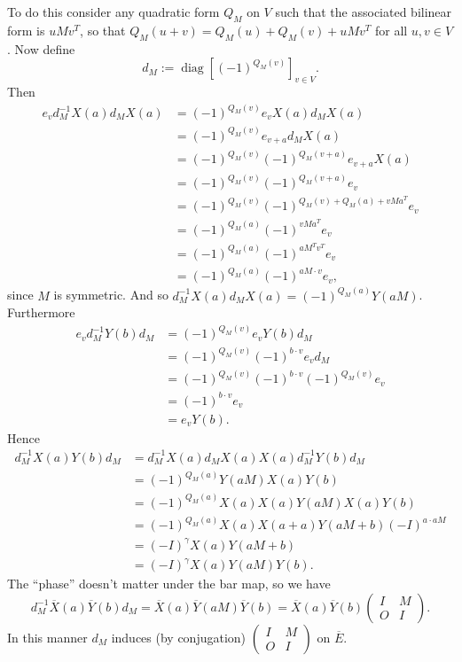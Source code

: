 \documentclass[a4paper]{article}
\DeclareMathOperator{\diag}{diag}
\begin{document}
  To do this consider any quadratic form $Q_M$ on $V$ such
  that the associated bilinear form is $u M v^{T}$, so that
  $Q_M(u+v) = Q_M(u) + Q_M(v) + uMv^{T}$ for all $u, v \in
  V$. Now define
  \begin{equation}
    d_M := \diag\left[(-1)^{Q_M(v)}\right]_{v \in V}.
  \end{equation}
  Then 
  \begin{align*}
    e_v d_M^{-1} X(a) d_M X(a)
    &= (-1)^{Q_M(v)} e_v X(a) d_M X(a) \\
    &= (-1)^{Q_M(v)} e_{v+a} d_M X(a) \\
    &= (-1)^{Q_M(v)} (-1)^{Q_M(v+a)} e_{v+a} X(a) \\
    &= (-1)^{Q_M(v)} (-1)^{Q_M(v+a)} e_v \\
    &= (-1)^{Q_M(v)} (-1)^{Q_M(v) + Q_M(a) + vMa^{T}} e_v \\
    &= (-1)^{Q_M(a)} (-1)^{vMa^{T}} e_v \\
    &= (-1)^{Q_M(a)} (-1)^{aM^{T}v^{T}} e_v \\
    &= (-1)^{Q_M(a)} (-1)^{aM \cdot v} e_v,
  \end{align*}
  since $M$ is symmetric. And so $d_M^{-1} X(a) d_M X(a) =
  (-1)^{Q_M(a)} Y(aM)$. Furthermore
  \begin{align*}
    e_v d_M^{-1} Y(b) d_M
    &= (-1)^{Q_M(v)} e_v Y(b) d_M \\
    &= (-1)^{Q_M(v)} (-1)^{b \cdot v} e_v d_M \\
    &= (-1)^{Q_M(v)} (-1)^{b \cdot v} (-1)^{Q_M(v)} e_v \\
    &= (-1)^{b \cdot v} e_v \\
    &= e_v Y(b).
  \end{align*}
  Hence
  \begin{align*}
    d_M^{-1} X(a)Y(b)d_M
    &= d_M^{-1} X(a) d_M X(a) X(a) d_M^{-1} Y(b) d_M \\
    &= (-1)^{Q_M(a)} Y(aM) X(a) Y(b) \\
    &= (-1)^{Q_M(a)} X(a) X(a) Y(aM) X(a) Y(b) \\
    &= (-1)^{Q_M(a)} X(a) X(a+a) Y(aM+b) (-I)^{a \cdot aM}
    \\
    &= (-I)^{\gamma} X(a) Y(aM+b) \\
    &= (-I)^{\gamma} X(a) Y(aM) Y(b).
  \end{align*}
  The ``phase'' doesn't matter under the bar map, so we have
  \begin{equation}
    d_M^{-1} \overline{X}(a)\overline{Y}(b)d_M
    = \overline{X}(a) \overline{Y}(aM) \overline{Y}(b)
    = \overline{X}(a)\overline{Y}(b) 
    \begin{pmatrix} I & M \\ O & I \end{pmatrix}.
  \end{equation}
  In this manner $d_M$ induces (by conjugation)
  $\begin{pmatrix} I & M \\ O & I\end{pmatrix}$ on
  $\overline{E}$.
\end{document}
